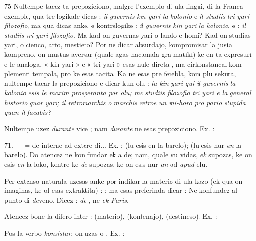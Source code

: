 \begin{VUpage}[79]{75}
Nultempe tacez ta prepoziciono, malgre l'exemplo di ula\nl
lingui, di la Franca exemple, qua tre logikale dicas : \textit{il}\nl
\textit{guvernis}  \textit{kin yari la kolonio} e \textit{il studiis}  \textit{tri yari}\nl
\textit{filozofio}, ma qua dicas anke, e kontrelogike : \textit{il guvernis kin}\nl
\textit{yari la kolonio}, e : \textit{il studiis tri yari filozofio}. Ma kad on\nl
guvernas yari o lando e homi? Kad on studias yari, o cienco,\nl
arto, mestiero? Por ne dicar absurdajo, kompromisar la justa\nl
kompreno, on mustus avertar (quale agas nacionala gra\cc
matiki) ke en ta expresuri e le analoga, « kin yari » e « tri\nl
yari » esas nule direta , ma cirkonstancal kom\cc
plementi tempala, pro ke  esas tacita. Ka ne esas pre\cc
ferebla, kom plu sekura, nultempe tacar la prepoziciono e\nl
dicar kun olu : \textit{la kin yari}  \textit{qui il guvernis la kolonio}\nl
\textit{esis le maxim prosperanta por olu; me studiis filozofio} \nl
\textit{tri yari e la general historio}  \textit{quar yari; il retromarchis}\nl
\textit{o marchis retroe}  \textit{un mi-horo pro pario stupida quan}\nl
\textit{il facabis?}

Nultempe uzez \textit{durante} vice ; nam \textit{durante} ne esas\nl
prepoziciono. Ex. : \nl
{}

\VUblanc{6.37pt}%
71. ---  = de interne ad extere di... Ex. : \nl
{} (lu esis en la barelo); \nl
{} (lu esis nur \textit{an} la barelo). Do atencez ne kon\cc
fundar ek a de; nam, quale vu vidas, \textit{ek} supozas, ke on esis\nl
\textit{en} la loko, kontre ke \textit{de} supozas, ke on esis nur \textit{an} od\nl
\textit{apud} olu.

Per extenso naturala  uzesas anke por indikar la materio\nl
di ula kozo (ek qua on imaginas, ke ol esas extraktita) : \nl
{}; ma esas preferinda dicar : \cc
{}\nl
{} Ne konfundez  al punto di \textit{de}veno. Dicez :\nl
{} \textit{de} , ne \textit{ek Paris}.

Atencez bone la difero inter :  (materio),\nl
{} (kontenajo),  (destineso). Ex. :\nl
{}

Pos la verbo \textit{konsistar}, on uzas  o . Ex. : \nl
{}\nl
{}

\parplein
\end{VUpage}

